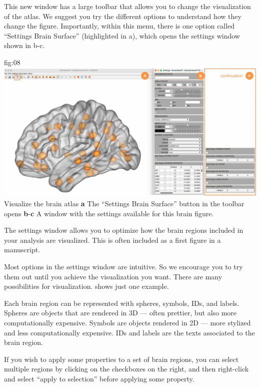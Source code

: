 \documentclass[justified]{tufte-handout}
\begin{document}
This new window has a large toolbar that allows you to change the visualization of the atlas. We suggest you try the different options to understand how they change the figure. Importantly, within this menu, there is one option called ``Settings Brain Surface'' (highlighted in a), which opens the settings window shown in b-c.

	{fig:08}
	{\includegraphics{fig08.jpg}}
	{Visualize the brain atlas}
	{
	{\bf a} The ``Settings Brain Surface'' button in the toolbar opens {\bf b}-{\bf c} A window with the settings available for this brain figure.
	}


The settings window allows you to optimize how the brain regions included in your analysis are visualized. This is often included as a first figure in a manuscript.

Most options in the settings window are intuitive. So we encourage you to try them out until you achieve the visualization you want. There are many possibilities for visualization.  shows just one example.

Each brain region can be represented with spheres, symbols, IDs, and labels.
Spheres are objects that are rendered in 3D --- often prettier, but also more computationally expensive.
Symbols are objects rendered in 2D --- more stylized and less computationally expensive.
IDs and labels are the texts associated to the brain region.

If you wish to apply some properties to a set of brain regions, you can select multiple regions by clicking on the checkboxes on the right, and then right-click and select ``apply to selection'' before applying some property.

\end{document}
